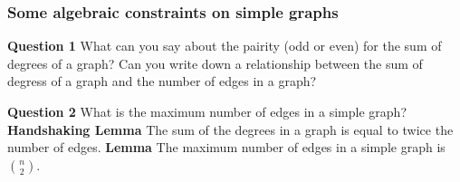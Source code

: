 \documentclass{beamer}
\begin{document}
\frame
{
  \frametitle{Some algebraic constraints on simple graphs}

{\bf Question 1} What can you say about the pairity (odd or even) for the sum of degrees of a graph?  Can you write down a relationship between the sum of degress of a graph and the number of edges in a graph?

\vfill
{\bf Question 2} What is the maximum number of edges in a simple graph?
\vfill
\pause
{\bf Handshaking Lemma}  The sum of the degrees in a graph is equal to twice the number of edges.
\vfill
\vfill
{\bf Lemma} The maximum number of edges in a simple graph is $\binom{n}{2}$.

}
\end{document}
